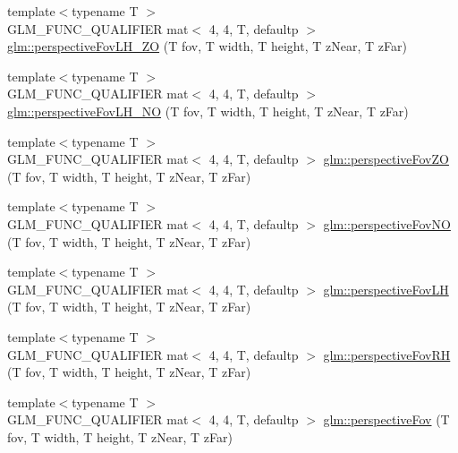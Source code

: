 \begin{DoxyCompactItemize}
\item 
{\footnotesize template$<$typename T $>$ }\\G\+L\+M\+\_\+\+F\+U\+N\+C\+\_\+\+Q\+U\+A\+L\+I\+F\+I\+ER mat$<$ 4, 4, T, defaultp $>$ \hyperlink{group__gtc__matrix__transform_gabdd37014f529e25b2fa1b3ba06c10d5c}{glm\+::perspective\+Fov\+L\+H\+\_\+\+ZO} (T fov, T width, T height, T z\+Near, T z\+Far)
\item 
{\footnotesize template$<$typename T $>$ }\\G\+L\+M\+\_\+\+F\+U\+N\+C\+\_\+\+Q\+U\+A\+L\+I\+F\+I\+ER mat$<$ 4, 4, T, defaultp $>$ \hyperlink{group__gtc__matrix__transform_gad18a4495b77530317327e8d466488c1a}{glm\+::perspective\+Fov\+L\+H\+\_\+\+NO} (T fov, T width, T height, T z\+Near, T z\+Far)
\item 
{\footnotesize template$<$typename T $>$ }\\G\+L\+M\+\_\+\+F\+U\+N\+C\+\_\+\+Q\+U\+A\+L\+I\+F\+I\+ER mat$<$ 4, 4, T, defaultp $>$ \hyperlink{group__gtc__matrix__transform_ga4bc69fa1d1f95128430aa3d2a712390b}{glm\+::perspective\+Fov\+ZO} (T fov, T width, T height, T z\+Near, T z\+Far)
\item 
{\footnotesize template$<$typename T $>$ }\\G\+L\+M\+\_\+\+F\+U\+N\+C\+\_\+\+Q\+U\+A\+L\+I\+F\+I\+ER mat$<$ 4, 4, T, defaultp $>$ \hyperlink{group__gtc__matrix__transform_gaf30e7bd3b1387a6776433dd5383e6633}{glm\+::perspective\+Fov\+NO} (T fov, T width, T height, T z\+Near, T z\+Far)
\item 
{\footnotesize template$<$typename T $>$ }\\G\+L\+M\+\_\+\+F\+U\+N\+C\+\_\+\+Q\+U\+A\+L\+I\+F\+I\+ER mat$<$ 4, 4, T, defaultp $>$ \hyperlink{group__gtc__matrix__transform_ga6aebe16c164bd8e52554cbe0304ef4aa}{glm\+::perspective\+Fov\+LH} (T fov, T width, T height, T z\+Near, T z\+Far)
\item 
{\footnotesize template$<$typename T $>$ }\\G\+L\+M\+\_\+\+F\+U\+N\+C\+\_\+\+Q\+U\+A\+L\+I\+F\+I\+ER mat$<$ 4, 4, T, defaultp $>$ \hyperlink{group__gtc__matrix__transform_gaf32bf563f28379c68554a44ee60c6a85}{glm\+::perspective\+Fov\+RH} (T fov, T width, T height, T z\+Near, T z\+Far)
\item 
{\footnotesize template$<$typename T $>$ }\\G\+L\+M\+\_\+\+F\+U\+N\+C\+\_\+\+Q\+U\+A\+L\+I\+F\+I\+ER mat$<$ 4, 4, T, defaultp $>$ \hyperlink{group__gtc__matrix__transform_gaebd02240fd36e85ad754f02ddd9a560d}{glm\+::perspective\+Fov} (T fov, T width, T height, T z\+Near, T z\+Far)

\end{DoxyCompactItemize}

